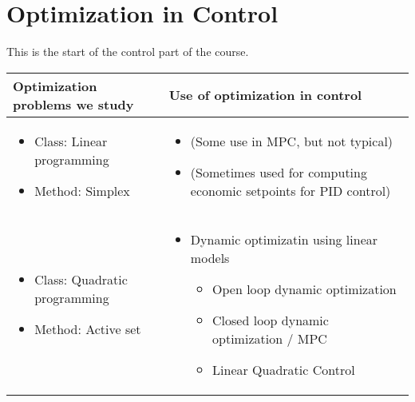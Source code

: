 \documentclass{article}
\begin{document}
\maketitle

\section{Optimization in Control}

This is the start of the control part of the course.

\begin{center}
  \begin{tabular}{p{6cm}p{10cm}} %
    \textbf{Optimization problems we study} & \textbf{Use of optimization in control}      \\
    \hline
    \begin{itemize}
      \item Class: Linear programming
      \item Method: Simplex
    \end{itemize}
                                            &
    \begin{itemize}
      \item (Some use in MPC, but not typical)
      \item (Sometimes used for computing economic setpoints for PID control)
    \end{itemize}
    \\
    \hline
    \begin{itemize}
      \item Class: Quadratic programming
      \item Method: Active set
    \end{itemize}
                                            & \begin{itemize}
                                                \item Dynamic optimizatin using linear models
                                                      \begin{itemize}
              \item Open loop dynamic optimization
              \item Closed loop dynamic optimization / MPC
              \item Linear Quadratic Control
            \end{itemize}
                                              \end{itemize} \\

\end{tabular}
\end{center}
\end{document}
